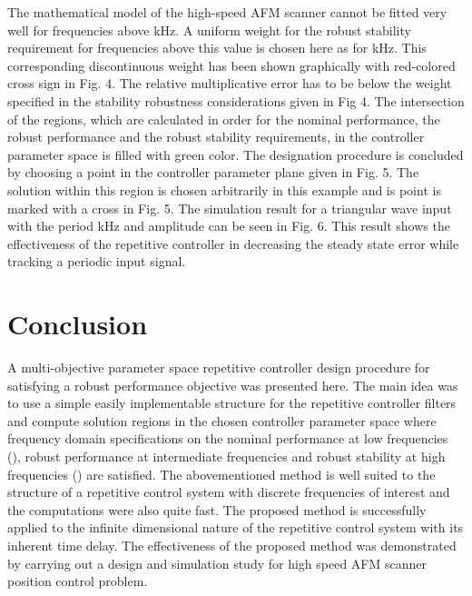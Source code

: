 \documentclass[12pt,draftcls,onecolumn]{IEEEtran}
\begin{document}
The mathematical model of the high-speed AFM scanner cannot be fitted very well for frequencies above  kHz. A uniform weight
for the robust stability requirement for frequencies above this value is chosen here as  for  kHz. This
corresponding discontinuous weight  has been shown graphically with red-colored cross sign in Fig. 4. The relative
multiplicative error  has to be below the weight specified in the stability robustness considerations given
in Fig 4. The intersection of the regions, which are calculated in order for the nominal performance, the robust performance and the
robust stability requirements, in the  controller parameter space is filled with green color. The designation
procedure is concluded by choosing a point in the controller parameter plane given in Fig. 5. The solution within this region
is chosen arbitrarily in this example and is point is marked with a cross in Fig. 5. The simulation result for a triangular wave
input with the period  kHz and amplitude can be seen in Fig. 6. This result shows the effectiveness of the repetitive controller
in decreasing the steady state error while tracking a periodic input signal.

\section{Conclusion}

A multi-objective parameter space repetitive controller design procedure for satisfying a robust performance objective was
presented here. The main idea was to use a simple easily implementable structure for the repetitive controller filters and
compute solution regions in the chosen controller parameter space where frequency domain specifications on the nominal performance
at low frequencies (), robust performance at intermediate frequencies and robust stability at high frequencies ()
are satisfied. The abovementioned method is well suited to the structure of a repetitive control system with discrete frequencies
of interest and the computations were also quite fast. The proposed method is successfully applied to the infinite
dimensional nature of the repetitive control system with its inherent time delay. The effectiveness of the proposed method was
demonstrated by carrying out a design and simulation study for high speed AFM scanner position control problem.




\end{document}
